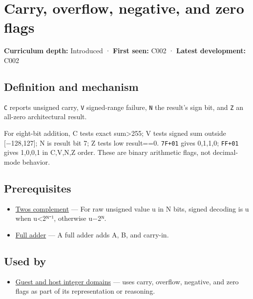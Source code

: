 \hypertarget{appendix-8d687c9c08ab}{}\label{referencestart:appendix-8d687c9c08ab}
\section{Carry, overflow, negative, and zero flags}\label{appendix-8d687c9c08ab-carry-overflow-negative-and-zero-flags}

\textbf{Curriculum depth:} Introduced · \textbf{First seen:} C002 · \textbf{Latest development:} C002

\subsection{Definition and mechanism}\label{appendix-8d687c9c08ab-definition-and-mechanism}

\texttt{C} reports unsigned carry, \texttt{V} signed-range failure, \texttt{N} the result's sign bit, and \texttt{Z} an all-zero architectural result.

For eight-bit addition, C tests exact sum\textgreater255; V tests signed sum outside {[}−128,127{]}; N is result bit 7; Z tests low result==0. \texttt{7F+01} gives 0,1,1,0; \texttt{FF+01} gives 1,0,0,1 in C,V,N,Z order. These are binary arithmetic flags, not decimal-mode behavior.

\subsection{Prerequisites}\label{appendix-8d687c9c08ab-prerequisites}

\begin{itemize}
\tightlist
\item
  \hyperref[appendix-4fbc03d20829]{Two\textquotesingle s complement} --- For raw unsigned value u in N bits, signed decoding is u when u\textless2ᴺ⁻¹, otherwise u−2ᴺ.
\item
  \hyperref[appendix-d1a5b1e520c2]{Full adder} --- A full adder adds A, B, and carry-in.
\end{itemize}

\subsection{Used by}\label{appendix-8d687c9c08ab-used-by}

\begin{itemize}
\tightlist
\item
  \hyperref[appendix-33e7a011b684]{Guest and host integer domains} --- uses carry, overflow, negative, and zero flags as part of its representation or reasoning.
\end{itemize}

